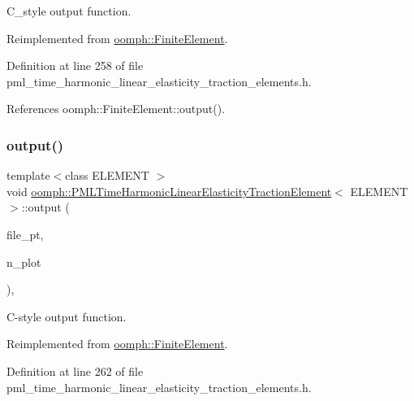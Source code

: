 C\+\_\+style output function. 



Reimplemented from \hyperlink{classoomph_1_1FiniteElement_a72cddd09f8ddbee1a20a1ff404c6943e}{oomph\+::\+Finite\+Element}.



Definition at line 258 of file pml\+\_\+time\+\_\+harmonic\+\_\+linear\+\_\+elasticity\+\_\+traction\+\_\+elements.\+h.



References oomph\+::\+Finite\+Element\+::output().

\mbox{\label{classoomph_1_1PMLTimeHarmonicLinearElasticityTractionElement_abbd6d562916430554b8b39fda992ef37}} 
\subsubsection{\texorpdfstring{output()}{output()}\hspace{0.1cm}{\footnotesize\ttfamily [4/4]}}
{\footnotesize\ttfamily template$<$class E\+L\+E\+M\+E\+NT $>$ \\
void \hyperlink{classoomph_1_1PMLTimeHarmonicLinearElasticityTractionElement}{oomph\+::\+P\+M\+L\+Time\+Harmonic\+Linear\+Elasticity\+Traction\+Element}$<$ E\+L\+E\+M\+E\+NT $>$\+::output (\begin{DoxyParamCaption}\item[{F\+I\+LE $\ast$}]{file\+\_\+pt,  }\item[{const unsigned \&}]{n\+\_\+plot }\end{DoxyParamCaption})\hspace{0.3cm}{\ttfamily [inline]}, {\ttfamily [virtual]}}



C-\/style output function. 



Reimplemented from \hyperlink{classoomph_1_1FiniteElement_adfaee690bb0608f03320eeb9d110d48c}{oomph\+::\+Finite\+Element}.



Definition at line 262 of file pml\+\_\+time\+\_\+harmonic\+\_\+linear\+\_\+elasticity\+\_\+traction\+\_\+elements.\+h.



